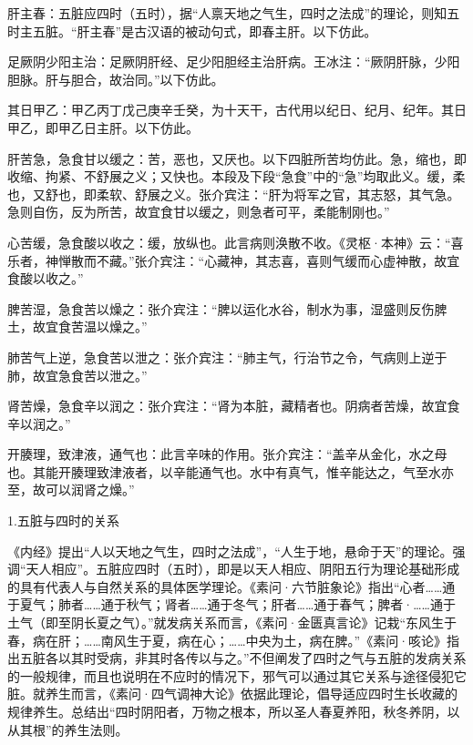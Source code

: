 \documentclass[draft,12pt]{ctexbook}
\begin{document}
\begin{jiaozhu}
  \item 肝主春：五脏应四时（五时），据“人禀天地之气生，四时之法成”的理论，则知五时主五脏。“肝主春”是古汉语的被动句式，即春主肝。以下仿此。
  \item 足厥阴少阳主治：足厥阴肝经、足少阳胆经主治肝病。王冰注：“厥阴肝脉，少阳胆脉。肝与胆合，故治同。”以下仿此。
  \item 其日甲乙：甲乙丙丁戊己庚辛壬癸，为十天干，古代用以纪日、纪月、纪年。其日甲乙，即甲乙日主肝。以下仿此。
  \item 肝苦急，急食甘以缓之：苦，恶也，又厌也。以下四脏所苦均仿此。急，缩也，即收缩、拘紧、不舒展之义；又快也。本段及下段“急食”中的“急”均取此义。缓，柔也，又舒也，即柔软、舒展之义。张介宾注：“肝为将军之官，其志怒，其气急。急则自伤，反为所苦，故宜食甘以缓之，则急者可平，柔能制刚也。”
  \item 心苦缓，急食酸以收之：缓，放纵也。此言病则涣散不收。《灵枢·本神》云：“喜乐者，神惮散而不藏。”张介宾注：“心藏神，其志喜，喜则气缓而心虚神散，故宜食酸以收之。”
  \item 脾苦湿，急食苦以燥之：张介宾注：“脾以运化水谷，制水为事，湿盛则反伤脾土，故宜食苦温以燥之。”
  \item 肺苦气上逆，急食苦以泄之：张介宾注：“肺主气，行治节之令，气病则上逆于肺，故宜急食苦以泄之。”
  \item 肾苦燥，急食辛以润之：张介宾注：“肾为本脏，藏精者也。阴病者苦燥，故宜食辛以润之。”
  \item 开腠理，致津液，通气也：此言辛味的作用。张介宾注：“盖辛从金化，水之母也。其能开腠理致津液者，以辛能通气也。水中有真气，惟辛能达之，气至水亦至，故可以润肾之燥。”
\end{jiaozhu}


1.五脏与四时的关系

《内经》提出“人以天地之气生，四时之法成”，“人生于地，悬命于天”的理论。强调“天人相应”。五脏应四时（五时），即是以天人相应、阴阳五行为理论基础形成的具有代表人与自然关系的具体医学理论。《素问·六节脏象论》指出“心者……通于夏气；肺者……通于秋气；肾者……通于冬气；肝者……通于春气；脾者·……通于土气（即至阴长夏之气）。”就发病关系而言，《素问·金匮真言论》记栽“东风生于春，病在肝；……南风生于夏，病在心；……中央为土，病在脾。”《素问·咳论》指出五脏各以其时受病，非其时各传以与之。”不但阐发了四时之气与五脏的发病关系的一般规律，而且也说明在不应时的情况下，邪气可以通过其它关系与途径侵犯它脏。就养生而言，《素问·四气调神大论》依据此理论，倡导适应四时生长收藏的规律养生。总结出“四时阴阳者，万物之根本，所以圣人春夏养阳，秋冬养阴，以从其根”的养生法则。
\end{document}
